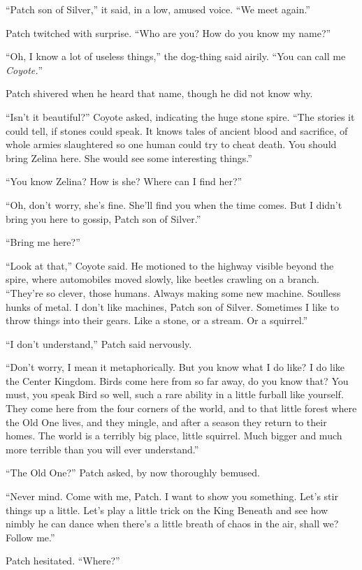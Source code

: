 \documentclass[ebook,oneside,openany,17pt]{memoir}
\begin{document}
“Patch son of Silver,” it said, in a low, amused voice. “We meet
again.”

Patch twitched with surprise. “Who are you? How do you know my name?”

“Oh, I know a lot of useless things,” the dog-thing said airily. “You
can call me \emph{Coyote.}”

Patch shivered when he heard that name, though he did not know why.

“Isn’t it beautiful?” Coyote asked, indicating the huge stone
spire. “The stories it could tell, if stones could speak. It knows
tales of ancient blood and sacrifice, of whole armies slaughtered so
one human could try to cheat death. You should bring Zelina here. She
would see some interesting things.”

“You know Zelina? How is she? Where can I find her?”

“Oh, don’t worry, she’s fine. She’ll find you when the time comes. But
I didn’t bring you here to gossip, Patch son of Silver.”

“Bring me here?”

“Look at that,” Coyote said. He motioned to the highway visible beyond
the spire, where automobiles moved slowly, like beetles crawling on a
branch. “They’re so clever, those humans. Always making some new
machine. Soulless hunks of metal. I don’t like machines, Patch son of
Silver. Sometimes I like to throw things into their gears. Like a
stone, or a stream. Or a squirrel.”

“I don’t understand,” Patch said nervously.

“Don’t worry, I mean it metaphorically. But you know what I do like?
I do like the Center Kingdom. Birds come here from so far away, do you
know that? You must, you speak Bird so well, such a rare ability in a
little furball like yourself. They come here from the four corners of
the world, and to that little forest where the Old One lives, and they
mingle, and after a season they return to their homes. The world is a
terribly big place, little squirrel. Much bigger and much more
terrible than you will ever understand.”

“The Old One?” Patch asked, by now thoroughly bemused.

“Never mind. Come with me, Patch. I want to show you something. Let’s
stir things up a little. Let’s play a little trick on the King Beneath
and see how nimbly he can dance when there’s a little breath of chaos
in the air, shall we? Follow me.”

Patch hesitated. “Where?”
\end{document}

